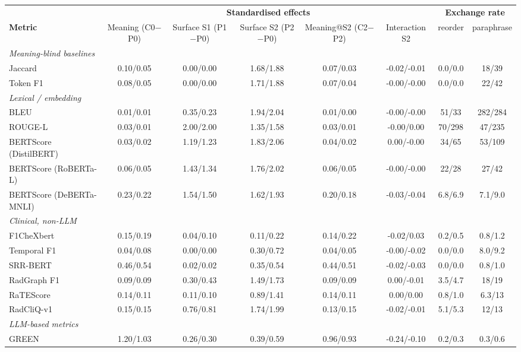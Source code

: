 \begin{tabular}{lccccccc}
\toprule
 & \multicolumn{5}{c}{\textbf{Standardised effects}} & \multicolumn{2}{c}{\textbf{Exchange rate}} \\
\cmidrule(lr){2-6}\cmidrule(lr){7-8}
\textbf{Metric} & Meaning (C0$-$P0) & Surface S1 (P1$-$P0) & Surface S2 (P2$-$P0) & Meaning@S2 (C2$-$P2) & Interaction S2 & reorder & paraphrase \\
\midrule
\multicolumn{8}{l}{\textit{Meaning-blind baselines}} \\
Jaccard & 0.10/0.05 & 0.00/0.00 & 1.68/1.88 & 0.07/0.03 & -0.02/-0.01 & 0.0/0.0 & 18/39 \\
Token F1 & 0.08/0.05 & 0.00/0.00 & 1.71/1.88 & 0.07/0.04 & -0.00/-0.00 & 0.0/0.0 & 22/42 \\
\multicolumn{8}{l}{\textit{Lexical / embedding}} \\
BLEU & 0.01/0.01 & 0.35/0.23 & 1.94/2.04 & 0.01/0.00 & -0.00/-0.00 & 51/33 & 282/284 \\
ROUGE-L & 0.03/0.01 & 2.00/2.00 & 1.35/1.58 & 0.03/0.01 & -0.00/0.00 & 70/298 & 47/235 \\
BERTScore (DistilBERT) & 0.03/0.02 & 1.19/1.23 & 1.83/2.06 & 0.04/0.02 & 0.00/-0.00 & 34/65 & 53/109 \\
BERTScore (RoBERTa-L) & 0.06/0.05 & 1.43/1.34 & 1.76/2.02 & 0.06/0.05 & -0.00/-0.00 & 22/28 & 27/42 \\
BERTScore (DeBERTa-MNLI) & 0.23/0.22 & 1.54/1.50 & 1.62/1.93 & 0.20/0.18 & -0.03/-0.04 & 6.8/6.9 & 7.1/9.0 \\
\multicolumn{8}{l}{\textit{Clinical, non-LLM}} \\
F1CheXbert & 0.15/0.19 & 0.04/0.10 & 0.11/0.22 & 0.14/0.22 & -0.02/0.03 & 0.2/0.5 & 0.8/1.2 \\
Temporal F1 & 0.04/0.08 & 0.00/0.00 & 0.30/0.72 & 0.04/0.05 & -0.00/-0.02 & 0.0/0.0 & 8.0/9.2 \\
SRR-BERT & 0.46/0.54 & 0.02/0.02 & 0.35/0.54 & 0.44/0.51 & -0.02/-0.03 & 0.0/0.0 & 0.8/1.0 \\
RadGraph F1 & 0.09/0.09 & 0.30/0.43 & 1.49/1.73 & 0.09/0.09 & 0.00/-0.01 & 3.5/4.7 & 18/19 \\
RaTEScore & 0.14/0.11 & 0.11/0.10 & 0.89/1.41 & 0.14/0.11 & 0.00/0.00 & 0.8/1.0 & 6.3/13 \\
RadCliQ-v1 & 0.15/0.15 & 0.76/0.81 & 1.74/1.99 & 0.13/0.15 & -0.02/-0.01 & 5.1/5.3 & 12/13 \\
\multicolumn{8}{l}{\textit{LLM-based metrics}} \\
GREEN & 1.20/1.03 & 0.26/0.30 & 0.39/0.59 & 0.96/0.93 & -0.24/-0.10 & 0.2/0.3 & 0.3/0.6 \\

\end{tabular}

